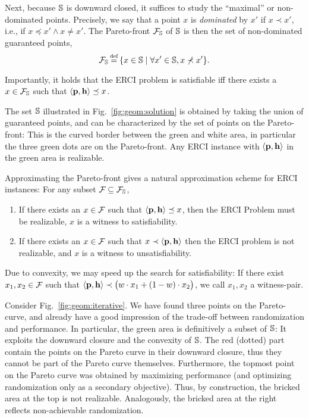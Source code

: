 Next, because $\mathbb{S}$ is downward closed, it
suffices to study the ``maximal'' or non-dominated points.  Precisely,
we say that a point $x$ is \emph{dominated} by $x'$ if $x \prec
x'$, i.e., if $x \preceq x' \wedge x \neq x'$.
The Pareto-front $\mathcal{F}_{\mathbb{S}}$ of $\mathbb{S}$ is then the set of non-dominated guaranteed points,
\begin{equation}
  \pareto{\solutions} \eqdef \{ x \in \solutions \mid \forall x' \in \solutions, x \not\prec x'  \}.  
\end{equation}
\noindent
\begin{mdframed}
Importantly, it holds that the ERCI problem is satisfiable iff there exists a  $x \in \mathcal{F}_{\mathbb{S}}$ such that $\langle \mathbf{p}, \mathbf{h} \rangle \preceq x$.    
\end{mdframed}
\begin{example}
	The set $\mathbb{S}$ illustrated in Fig.~\ref{fig:geom:solution} is obtained by taking the union of guaranteed points, and can be characterized by the set of points on the Pareto-front: This is the curved border between the green and white area, in particular the three green dots are on the Pareto-front. Any ERCI instance with $\langle \mathbf{p}, \mathbf{h} \rangle$ in the green area is realizable.
\end{example}


\noindent
Approximating the Pareto-front gives a natural approximation
scheme for ERCI instances: For any subset $\mathcal{F}_{} \subseteq
\mathcal{F}_{\mathbb{S}}$,
\begin{enumerate}
\item If there exists an $x \in \mathcal{F}_{}$ such that
$\langle \mathbf{p}, \mathbf{h} \rangle \preceq x$, then the ERCI
Problem must be realizable, $x$ is a witness to satisfiability.
\item If there exists an $x \in \mathcal{F}_{}$
such that $x \prec \langle \mathbf{p}, \mathbf{h} \rangle$ then the
ERCI problem is not realizable, and $x$ is a witness to unsatisfiability.
\end{enumerate}
Due to convexity, we may speed up the search for satisfiability: If there exist $x_1, x_2 \in \mathcal{F}_{}$ such that $\langle \mathbf{p}, \mathbf{h} \rangle \prec \big(w \cdot x_1 + (1-w) \cdot x_2\big)$, we call $x_1,x_2$ a witness-pair.

\begin{example}
\label{ex:approximation}
	Consider Fig.~\ref{fig:geom:iterative}. We have found three points on the Pareto-curve, and already have a good impression of the trade-off between randomization and performance. In particular, the green area is definitively a subset of $\mathbb{S}$: It exploits the downward closure and the convexity of $\mathbb{S}$. The red (dotted) part contain the points on the Pareto curve in their downward closure, thus they cannot be part of the Pareto curve themselves.
	Furthermore, the topmost point on the Pareto curve was obtained by maximizing performance (and optimizing randomization only as a secondary objective). Thus, by construction, the bricked area at the top is not realizable. Analogously, the bricked area at the right reflects non-achievable randomization. 
\end{example}


